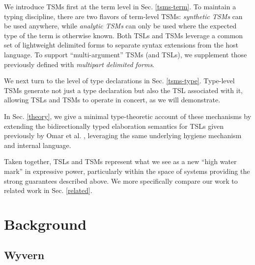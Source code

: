 \documentclass{sig-alternate}
\begin{document}
We introduce TSMs first at the term level in Sec. \ref{tsms-term}.  To maintain a typing discipline, there are two flavors of term-level TSMs: \emph{synthetic TSMs} can be used anywhere, while \emph{analytic TSMs} can only be used where the expected type of the term is otherwise known. Both TSLs and TSMs leverage a common set of  lightweight delimited forms to separate syntax extensions from the host language. To support ``multi-argument'' TSMs (and TSLs), we supplement those previously defined with \emph{multipart delimited forms}. 

We next turn to the level of type declarations  in Sec. \ref{tsms-type}. Type-level TSMs generate not just a type declaration but also the TSL associated with it, allowing TSLs and TSMs to operate in concert, as we will demonstrate. 

In Sec. \ref{theory}, we give a minimal type-theoretic account of these mechanisms by extending the bidirectionally typed elaboration semantics for TSLs given previously by Omar et al. \cite{TSLs}, leveraging the same underlying hygiene mechanism and internal language.%

Taken together, TSLs and TSMs represent what we see as a new ``high water mark'' in expressive power, particularly within the space of systems providing the strong guarantees described above. We more specifically compare our work to related work in Sec. \ref{related}. 

\section{Background}\label{background}
\subsection{Wyvern}
\end{document}
